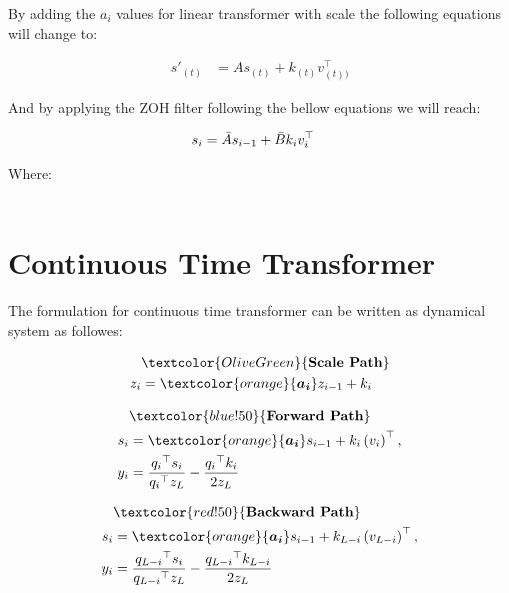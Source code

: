 By adding the $a_i$ values for linear transformer with scale the following equations will change to:

\begin{align*}
    s'_{(t)} &= As_{(t)} + {k_{(t)}} v_{(t))}^{\top}
\end{align*}

And by applying the ZOH filter following the bellow equations we will reach:

\begin{align*}
    s_i &= \Bar{A}s_{i-1} + \Bar{B}{k_i} v_i^{\top}
\end{align*}

Where:

\begin{align*}
    \
\end{align*}

\section{Continuous Time Transformer}

The formulation for continuous time transformer can be written as dynamical system as followes:




\begin{minipage}[t]{.3\linewidth}
  \begin{subequations}\label{eq:scale path}
    \begin{align}
    & \textcolor{OliveGreen}{\textbf{Scale Path}} \\
    z_i &= \textcolor{orange}{\boldsymbol{a_i}} z_{i-1} + k_i \\
    \end{align}
  \end{subequations}
\end{minipage}%
\begin{minipage}[t]{.3\linewidth}
  \begin{subequations}%
    \label{eq:forpass}
    \begin{align}
    & \textcolor{blue!50}{\textbf{Forward Path}} \\
    s_i &= \textcolor{orange}{\boldsymbol{a_i}} s_{i-1} + {k_i} \left(v_i\right)^{\top}, \\
    y_i &= \frac{{q_i}^{\top} s_i}{{q_i}^{\top} {{z_L} }} - {\frac{{q_i}^{{\top}}{k_i}}{{2z_L}}}
    \end{align}
  \end{subequations}
  \end{minipage}
  \begin{minipage}[t]{.4\linewidth}
    \begin{subequations}%
    \label{eq:backpass}
    \begin{align}
    & \textcolor{red!50}{\textbf{Backward Path}} \\
    s_i &= \textcolor{orange}{\boldsymbol{a_i}} s_{i-1} + {k_{L-i}} \left(v_{L-i}\right)^{\top}, \\
    y_i &= \frac{{q_{L-i}}^{\top} s_i}{{q_{L-i}}^{\top}{{z_L} }} - {\frac{{q_{L-i}}^{{\top}}{k_{L-i}}}{{2z_L}}}
    \end{align}
  \end{subequations}
\end{minipage}


